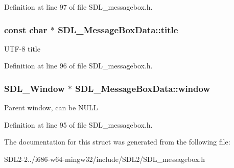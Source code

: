 Definition at line 97 of file S\+D\+L\+\_\+messagebox.\+h.

\hypertarget{structSDL__MessageBoxData_aff11d8661ef298059823d387be201741}{
\subsubsection[{title}]{\setlength{\rightskip}{0pt plus 5cm}const char $\ast$ S\+D\+L\+\_\+\+Message\+Box\+Data\+::title}}\label{structSDL__MessageBoxData_aff11d8661ef298059823d387be201741}
U\+T\+F-\/8 title 

Definition at line 96 of file S\+D\+L\+\_\+messagebox.\+h.

\hypertarget{structSDL__MessageBoxData_a3eaa3159704da921567882a1b9c84f0b}{
\subsubsection[{window}]{\setlength{\rightskip}{0pt plus 5cm}S\+D\+L\+\_\+\+Window $\ast$ S\+D\+L\+\_\+\+Message\+Box\+Data\+::window}}\label{structSDL__MessageBoxData_a3eaa3159704da921567882a1b9c84f0b}
Parent window, can be N\+U\+L\+L 

Definition at line 95 of file S\+D\+L\+\_\+messagebox.\+h.



The documentation for this struct was generated from the following file\+:\begin{DoxyCompactItemize}
\item 
S\+D\+L2-\/2../i686-\/w64-\/mingw32/include/\+S\+D\+L2/S\+D\+L\+\_\+messagebox.\+h\end{DoxyCompactItemize}
